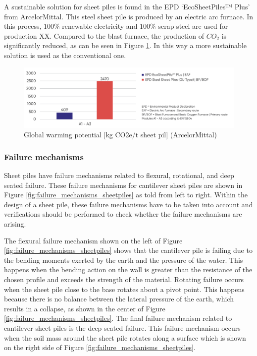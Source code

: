 A sustainable solution for sheet piles is found in the EPD ‘EcoSheetPiles™ Plus’ from ArcelorMittal. This steel sheet pile is produced by an electric arc furnace. In this process, $100\%$ renewable electricity and $100\%$ scrap steel are used for production XX. Compared to the blast furnace, the production of $CO_{2}$ is significantly reduced, as can be seen in Figure \ref{fig:eaf_bof}. In this way a more sustainable solution is used as the conventional one.

\begin{figure}[H]
    \centering
    \includegraphics[width=0.90\linewidth]{figures/ch8/eaf_bof.png}
    \caption{Global warming potential [kg CO2e/t sheet pil] (ArcelorMittal)}
    \label{fig:eaf_bof}
\end{figure}


\subsubsection{Failure mechanisms}

Sheet piles have failure mechanisms related to flexural, rotational, and deep seated failure. These failure mechanisms for cantilever sheet piles are shown in Figure \ref{fig:failure_mechanisms_sheetpiles} as told from left to right. Within the design of a sheet pile, these failure mechanisms have to be taken into account and verifications should be performed to check whether the failure mechanisms are arising.

The flexural failure mechanism shown on the left of Figure \ref{fig:failure_mechanisms_sheetpiles} shows that the cantilever pile is failing due to the bending moments exerted by the earth and the pressure of the water. This happens when the bending action on the wall is greater than the resistance of the chosen profile and exceeds the strength of the material. Rotating failure occurs when the sheet pile close to the base rotates about a pivot point. This happens because there is no balance between the lateral pressure of the earth, which results in a collapse, as shown in the center of Figure \ref{fig:failure_mechanisms_sheetpiles}. The final failure mechanism related to cantilever sheet piles is the deep seated failure. This failure mechanism occurs when the soil mass around the sheet pile rotates along a surface which is shown on the right side of Figure \ref{fig:failure_mechanisms_sheetpiles}.

